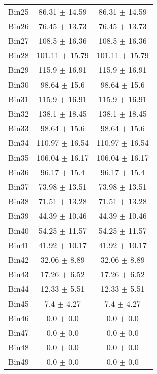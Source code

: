 \begin{tabular}{|c|c|c|}
     Bin25 & 86.31 $\pm$ 14.59 & 86.31 $\pm$ 14.59 \\ \cline{1-3} 
     Bin26 & 76.45 $\pm$ 13.73 & 76.45 $\pm$ 13.73 \\ \cline{1-3} 
     Bin27 & 108.5 $\pm$ 16.36 & 108.5 $\pm$ 16.36 \\ \cline{1-3} 
     Bin28 & 101.11 $\pm$ 15.79 & 101.11 $\pm$ 15.79 \\ \cline{1-3} 
     Bin29 & 115.9 $\pm$ 16.91 & 115.9 $\pm$ 16.91 \\ \cline{1-3} 
     Bin30 & 98.64 $\pm$ 15.6 & 98.64 $\pm$ 15.6 \\ \cline{1-3} 
     Bin31 & 115.9 $\pm$ 16.91 & 115.9 $\pm$ 16.91 \\ \cline{1-3} 
     Bin32 & 138.1 $\pm$ 18.45 & 138.1 $\pm$ 18.45 \\ \cline{1-3} 
     Bin33 & 98.64 $\pm$ 15.6 & 98.64 $\pm$ 15.6 \\ \cline{1-3} 
     Bin34 & 110.97 $\pm$ 16.54 & 110.97 $\pm$ 16.54 \\ \cline{1-3} 
     Bin35 & 106.04 $\pm$ 16.17 & 106.04 $\pm$ 16.17 \\ \cline{1-3} 
     Bin36 & 96.17 $\pm$ 15.4 & 96.17 $\pm$ 15.4 \\ \cline{1-3} 
     Bin37 & 73.98 $\pm$ 13.51 & 73.98 $\pm$ 13.51 \\ \cline{1-3} 
     Bin38 & 71.51 $\pm$ 13.28 & 71.51 $\pm$ 13.28 \\ \cline{1-3} 
     Bin39 & 44.39 $\pm$ 10.46 & 44.39 $\pm$ 10.46 \\ \cline{1-3} 
     Bin40 & 54.25 $\pm$ 11.57 & 54.25 $\pm$ 11.57 \\ \cline{1-3} 
     Bin41 & 41.92 $\pm$ 10.17 & 41.92 $\pm$ 10.17 \\ \cline{1-3} 
     Bin42 & 32.06 $\pm$ 8.89 & 32.06 $\pm$ 8.89 \\ \cline{1-3} 
     Bin43 & 17.26 $\pm$ 6.52 & 17.26 $\pm$ 6.52 \\ \cline{1-3} 
     Bin44 & 12.33 $\pm$ 5.51 & 12.33 $\pm$ 5.51 \\ \cline{1-3} 
     Bin45 & 7.4 $\pm$ 4.27 & 7.4 $\pm$ 4.27 \\ \cline{1-3} 
     Bin46 & 0.0 $\pm$ 0.0 & 0.0 $\pm$ 0.0 \\ \cline{1-3} 
     Bin47 & 0.0 $\pm$ 0.0 & 0.0 $\pm$ 0.0 \\ \cline{1-3} 
     Bin48 & 0.0 $\pm$ 0.0 & 0.0 $\pm$ 0.0 \\ \cline{1-3} 
     Bin49 & 0.0 $\pm$ 0.0 & 0.0 $\pm$ 0.0 \\ \cline{1-3} 

\end{tabular}
